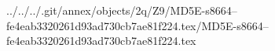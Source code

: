 ../../../.git/annex/objects/2q/Z9/MD5E-s8664--fe4eab3320261d93ad730cb7ae81f224.tex/MD5E-s8664--fe4eab3320261d93ad730cb7ae81f224.tex
